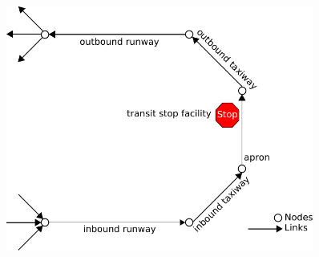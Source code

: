 \begin{figure}[t]
	\begin{minipage}{0.5\linewidth}
				\centering
			\includegraphics[width=0.9\textwidth]{extending/figures/air/sf_flight_model_airport.pdf}
		\vspace{1.3cm}


\end{minipage}
\end{figure}
